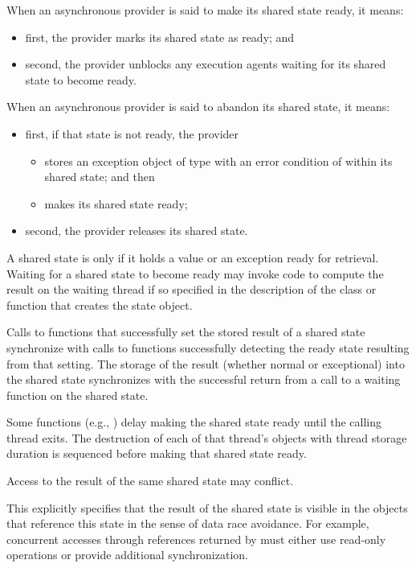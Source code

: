 \pnum
When an asynchronous provider is said to make its shared state ready, it means:
\begin{itemize}
\item
first, the provider marks its shared state as ready; and
\item
second, the provider unblocks any execution agents waiting for its shared
state to become ready.
\end{itemize}

\pnum
When an asynchronous provider is said to abandon its shared state, it means:
\begin{itemize}
\item
first, if that state is not ready, the provider
\begin{itemize}
\item
stores an exception object of type  with an error condition of
 within its shared state; and then
\item
makes its shared state ready;
\end{itemize}
\item
second, the provider releases its shared state.
\end{itemize}

\pnum
A shared state is  only if it holds a value or an exception ready for
retrieval.
Waiting for a shared state to become ready may invoke code to compute the result on
the waiting thread if so specified in the description of the class or function that creates
the state object.

\pnum
Calls to functions that successfully set the stored result of a shared
state synchronize
with calls to functions
successfully detecting the ready state resulting from that setting.
The storage of the result
(whether normal or exceptional) into the shared state
synchronizes with
the successful return from a call to a waiting function on the shared state.

\pnum
Some functions (e.g., ) delay making
the shared state ready until the calling thread exits. The destruction of
each of that thread's objects with thread storage duration
is sequenced before making that shared state ready.

\pnum
Access to the result of the same shared state may conflict.
\begin{note}
This explicitly specifies that the result of the shared state is
visible in the objects that reference this state in the sense of data race
avoidance. For example, concurrent accesses through
references returned by 
must either use read-only operations or provide additional synchronization.
\end{note}

